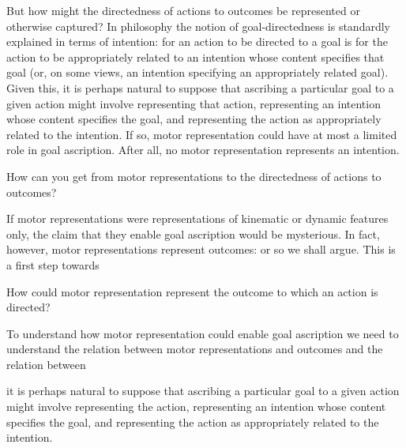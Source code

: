 \documentclass[12pt,\papersize]{extarticle}
\begin{document}
But how might the directedness of actions to outcomes be represented or otherwise captured? In philosophy the notion of goal-directedness is standardly explained in terms of intention: for an action to be directed to a goal is for the action to be appropriately related to an intention whose content specifies that goal (or, on some views, an intention specifying an appropriately related goal). Given this, it is perhaps natural to suppose that ascribing a particular goal to a given action might involve representing that action, representing an intention whose content specifies the goal, and representing the action as appropriately related to the intention.  If so, motor representation could have at most a limited role in goal ascription.  After all, no motor representation represents an intention.


How can you get from motor representations to the directedness of actions to outcomes?

If motor representations were representations of kinematic or dynamic features only, the claim that they enable goal ascription would be mysterious.  In fact, however, motor representations represent outcomes: or so we shall argue.  This is a first step towards 

How could motor representation represent the outcome to which an action is directed?

To understand how motor representation could enable goal ascription we need to understand the relation between motor representations and outcomes and the relation between






it is perhaps natural to suppose that ascribing a particular goal to a given action might involve representing the action, representing an intention whose content specifies the goal, and representing the action as appropriately related to the intention.
\end{document}
